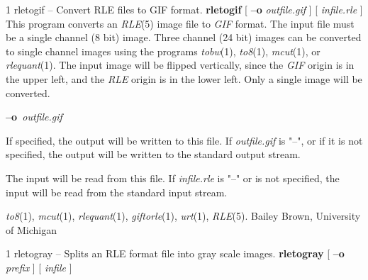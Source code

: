 %
%
%
 1
rletogif -- Convert RLE files to GIF format.
{\bf rletogif}
[
{\bf --o} 
{\it outfile.gif}
] [
{\it infile.rle}
]
This program converts an
{\it RLE}{\rm (5)}
image file to 
{\it GIF} 
format.  The input file must be a single channel
(8 bit) image.  Three channel (24 bit) images can be converted to
single channel images using the programs
{\it tobw}{\rm (1),}
{\it to8}{\rm (1),}
{\it mcut}{\rm (1),}
or
{\it rlequant}{\rm (1).}
The input image will be flipped vertically, since the 
{\it GIF}
origin is in the upper left, and the
{\it RLE}
origin is in the lower left.  Only a single image will be converted.
\begin{TPlist}{{\bf --o}{\it \ outfile.gif}
}
\item[{{\bf --o}{\it \ outfile.gif}
}]
If specified, the output will be written to this file.  If 
{\it outfile.gif}
is "--", or if it is not specified, the output will be written to the
standard output stream.
\item[{{\it infile.rle}}]
The input will be read from this file.  If
{\it infile.rle}
is "--" or is not specified, the input will be read from the standard
input stream.
\end{TPlist}
{\it to8}{\rm (1),}
{\it mcut}{\rm (1),}
{\it rlequant}{\rm (1),}
{\it giftorle}{\rm (1),}
{\it urt}{\rm (1),}
{\it RLE}{\rm (5).}
Bailey Brown, University of Michigan
\newpage


%
%
%
 1
rletogray -- Splits an RLE format file into gray scale images.
{\bf rletogray}
[
{\bf --o}
{\it prefix}
] [
{\it infile}
]


